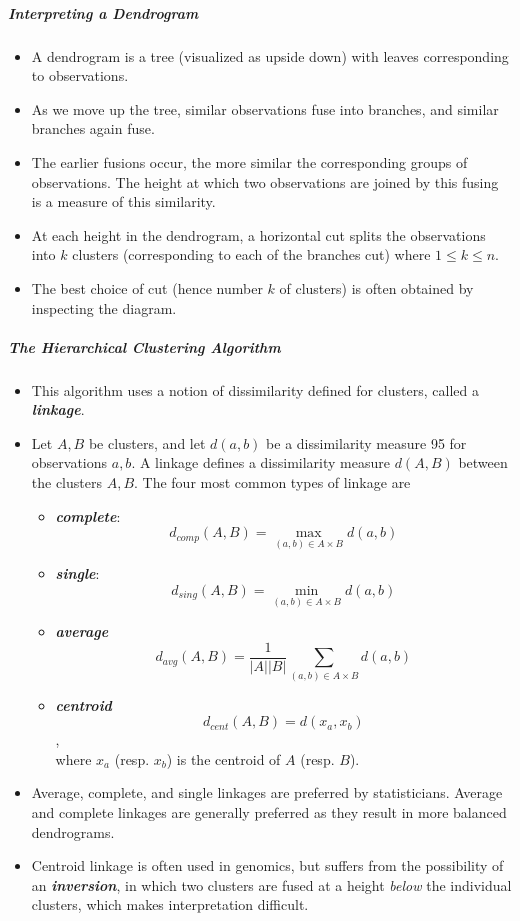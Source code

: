 \documentclass[11pt]{article}
\providecommand{\tightlist}{%
      \setlength{\itemsep}{0pt}\setlength{\parskip}{0pt}}
\begin{document}
    \hypertarget{interpreting-a-dendrogram}{%
\subparagraph{Interpreting a
Dendrogram}\label{interpreting-a-dendrogram}}

    \begin{itemize}
\tightlist
\item
  A dendrogram is a tree (visualized as upside down) with leaves
  corresponding to observations.
\item
  As we move up the tree, similar observations fuse into branches, and
  similar branches again fuse.
\item
  The earlier fusions occur, the more similar the corresponding groups
  of observations. The height at which two observations are joined by
  this fusing is a measure of this similarity.
\item
  At each height in the dendrogram, a horizontal cut splits the
  observations into \(k\) clusters (corresponding to each of the
  branches cut) where \(1 \leqslant k \leqslant n\).
\item
  The best choice of cut (hence number \(k\) of clusters) is often
  obtained by inspecting the diagram.
\end{itemize}

    \hypertarget{the-hierarchical-clustering-algorithm}{%
\subparagraph{The Hierarchical Clustering
Algorithm}\label{the-hierarchical-clustering-algorithm}}

    \begin{itemize}
\tightlist
\item
  This algorithm uses a notion of dissimilarity defined for clusters,
  called a \textbf{\emph{linkage}}.
\item
  Let \(A, B\) be clusters, and let \(d(a, b)\) be a dissimilarity
  measure 95 for observations \(a, b\). A linkage defines a
  dissimilarity measure \(d(A,B)\) between the clusters \(A, B\). The
  four most common types of linkage are

  \begin{itemize}
  \tightlist
  \item
    \textbf{\emph{complete}}:
    \[d_{comp}(A, B) = \underset{(a, b) \in A \times B}{\max} d(a, b)\]
  \item
    \textbf{\emph{single}}:
    \[d_{sing}(A, B) = \underset{(a, b) \in A \times B}{\min} d(a, b)\]
  \item
    \textbf{\emph{average}}
    \[d_{avg}(A, B) = \frac{1}{|A||B|} \underset{(a, b) \in A \times B}{\sum} d(a, b)\]
  \item
    \textbf{\emph{centroid}} \[d_{cent}(A, B) = d(x_a, x_b)\],\\
    where \(x_a\) (resp. \(x_b\)) is the centroid of \(A\) (resp.
    \(B\)).
  \end{itemize}
\item
  Average, complete, and single linkages are preferred by statisticians.
  Average and complete linkages are generally preferred as they result
  in more balanced dendrograms.
\item
  Centroid linkage is often used in genomics, but suffers from the
  possibility of an \textbf{\emph{inversion}}, in which two clusters are
  fused at a height \emph{below} the individual clusters, which makes
  interpretation difficult.
\end{itemize}
\end{document}
